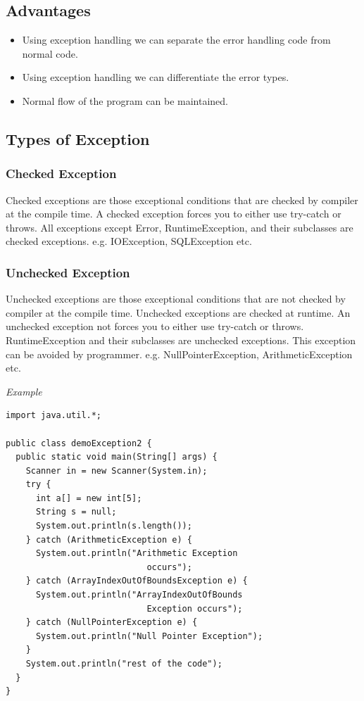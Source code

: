 \documentclass[twocolumn, a4paper]{article}
\begin{document}
\subsection{Advantages}
\begin{itemize}
  \item Using exception handling we can separate the error handling code from
    normal code.
  \item Using exception handling we can differentiate the error types.
  \item Normal flow of the program can be maintained.
\end{itemize}

\subsection{Types of Exception}
\subsubsection{Checked Exception}
Checked exceptions are those exceptional conditions that are checked by
compiler at the compile time. A checked exception forces you to either use
try-catch or throws. All exceptions except Error, RuntimeException, and their
subclasses are checked exceptions. e.g. IOException, SQLException etc.
\subsubsection{Unchecked Exception}
Unchecked exceptions are those exceptional conditions that are not checked by
compiler at the compile time. Unchecked exceptions are checked at runtime. An
unchecked exception not forces you to either use try-catch or throws.
RuntimeException and their subclasses are unchecked exceptions. This exception
can be avoided by programmer. e.g. NullPointerException, ArithmeticException
etc.

\newpage
\noindent\emph{Example}
\begin{lstlisting}
import java.util.*;

public class demoException2 {
  public static void main(String[] args) {
    Scanner in = new Scanner(System.in);
    try {
      int a[] = new int[5];
      String s = null;
      System.out.println(s.length());
    } catch (ArithmeticException e) {
      System.out.println("Arithmetic Exception
                            occurs");
    } catch (ArrayIndexOutOfBoundsException e) {
      System.out.println("ArrayIndexOutOfBounds
                            Exception occurs");
    } catch (NullPointerException e) {
      System.out.println("Null Pointer Exception");
    }
    System.out.println("rest of the code");
  }
}
\end{lstlisting}
\end{document}
